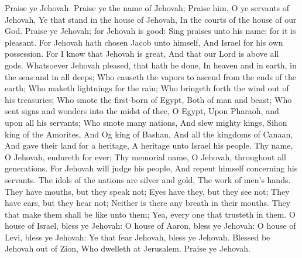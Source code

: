 Praise ye Jehovah. Praise ye the name of Jehovah; Praise him, O ye servants of Jehovah,  Ye that stand in the house of Jehovah, In the courts of the house of our God.  Praise ye Jehovah; for Jehovah is good: Sing praises unto his name; for it is pleasant.  For Jehovah hath chosen Jacob unto himself, And Israel for his own possession.  For I know that Jehovah is great, And that our Lord is above all gods.  Whatsoever Jehovah pleased, that hath he done, In heaven and in earth, in the seas and in all deeps;  Who causeth the vapors to ascend from the ends of the earth; Who maketh lightnings for the rain; Who bringeth forth the wind out of his treasuries;  Who smote the first-born of Egypt, Both of man and beast;  Who sent signs and wonders into the midst of thee, O Egypt, Upon Pharaoh, and upon all his servants;  Who smote many nations, And slew mighty kings,  Sihon king of the Amorites, And Og king of Bashan, And all the kingdoms of Canaan,  And gave their land for a heritage, A heritage unto Israel his people.  Thy name, O Jehovah, endureth for ever; Thy memorial name, O Jehovah, throughout all generations.  For Jehovah will judge his people, And repent himself concerning his servants.  The idols of the nations are silver and gold, The work of men’s hands.  They have mouths, but they speak not; Eyes have they, but they see not;  They have ears, but they hear not; Neither is there any breath in their mouths.  They that make them shall be like unto them; Yea, every one that trusteth in them.  O house of Israel, bless ye Jehovah: O house of Aaron, bless ye Jehovah:  O house of Levi, bless ye Jehovah: Ye that fear Jehovah, bless ye Jehovah.  Blessed be Jehovah out of Zion, Who dwelleth at Jerusalem. Praise ye Jehovah. 

